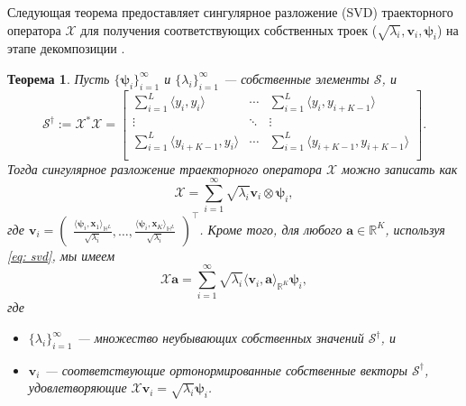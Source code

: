 \documentclass[a4paper, 11pt]{article}
\newtheorem{theorem}{Теорема} %
\begin{document}
Следующая теорема предоставляет сингулярное разложение (SVD) траекторного оператора $\mathcal{X}$ для получения соответствующих собственных троек ($\sqrt{\lambda_i}, \pmb{v}_i, \pmb{\psi}_i$) на этапе декомпозиции \cite{haghbin2019functionalsingularspectrumanalysis}.
\begin{theorem}
	\label{thm:svd}
	Пусть ${\{\pmb{\psi}_i\}_{i=1}^\infty}$ и ${\{\lambda_i\}_{i=1}^\infty}$ — собственные элементы $\mathcal{S}$, и
	\begin{equation}
		\mathcal{S}^\dag:=\mathcal{X}^*\mathcal{X}=
		\begin{bmatrix}
			\sum_{i=1}^L\langle y_i, y_{i}\rangle       & \cdots & \sum_{i=1}^L\langle y_i, y_{i+K-1}\rangle       \\
			\vdots                                      & \ddots & \vdots                                          \\
			\sum_{i=1}^L\langle y_{i+K-1}, y_{i}\rangle & \cdots & \sum_{i=1}^L\langle y_{i+K-1}, y_{i+K-1}\rangle \\
		\end{bmatrix}.
	\end{equation}
	Тогда сингулярное разложение траекторного оператора $\mathcal{X}$ можно записать как
	\begin{equation}
		\label{eq: svd}
		\mathcal{X} = \sum_{i=1}^\infty \sqrt{\lambda_i}\textbf{v}_i\otimes \pmb{\psi}_i,
	\end{equation}
	где
	$\textbf{v}_i=
		\begin{pmatrix} \frac{\langle\pmb{\psi}_i, {\pmb x}_1\rangle_{\mathbb{H}^L}}{\sqrt{\lambda_i}} , \ldots,\frac{ \langle\pmb{\psi}_i, {\pmb x}_K\rangle_{\mathbb{H}^L}}{\sqrt{\lambda_i}} \end{pmatrix}^\top$. Кроме того, для любого $\pmb{a}\in\mathbb{R}^K$, используя \eqref{eq: svd}, мы имеем
	\begin{equation}
		\mathcal{X}\pmb{a} = \sum_{i=1}^\infty \sqrt{\lambda_i} \langle \textbf{v}_i, \pmb{a}\rangle_{\mathbb{R}^K} \pmb{\psi}_i,
	\end{equation}
	где
	\begin{itemize}
		\item[i)] $\{\lambda_i\}_{i=1}^\infty$ — множество неубывающих собственных значений $\mathcal{S}^\dag$, и
		\item[ii)] $\pmb{v}_i$ — соответствующие ортонормированные собственные векторы $\mathcal{S}^\dag$, удовлетворяющие $\mathcal{X}\pmb{v}_i = \sqrt{\lambda_i} \pmb{\psi}_i$.
	\end{itemize}
\end{theorem}
\end{document}
